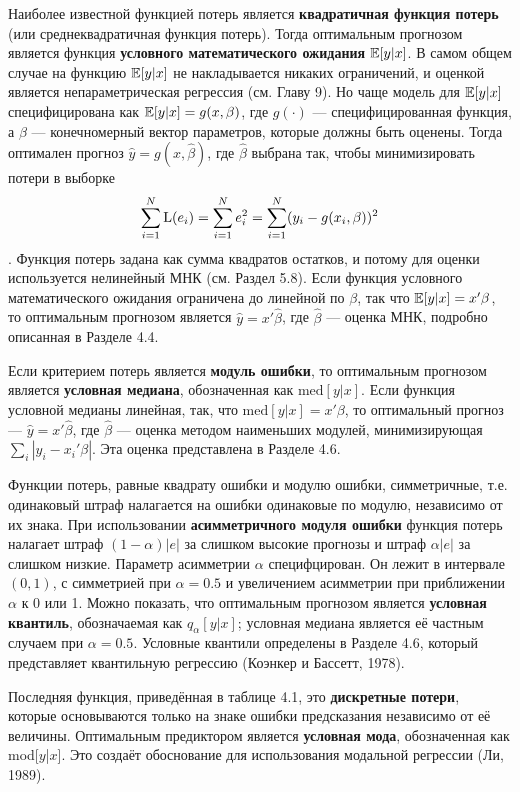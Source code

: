 Наиболее известной функцией потерь является \textbf{квадратичная функция потерь}  (или среднеквадратичная функция потерь). Тогда оптимальным прогнозом является функция \textbf{условного математического ожидания} $\mathbb{E}{[y|x]}$. В самом общем случае на функцию $\mathbb{E}{[y|x]}$ не накладывается никаких ограничений, и оценкой является непараметрическая регрессия (см. Главу 9). Но чаще модель для $\mathbb{E}{[y|x]}$ специфицирована как $\mathbb{E}{[y|x]} = g(x, \beta)$, где $g(\cdot)$ --- специфицированная функция, а $\beta$ --- конечномерный вектор параметров, которые должны быть оценены. Тогда оптимален прогноз $\hat{y} = g(x, \hat{\beta})$, где $\hat{\beta}$ выбрана так, чтобы минимизировать потери в выборке 
\[
\sum_{i=1}^{N}\mathrm{L}(e_i) = \sum_{i=1}^{N}e_i^2 = \sum_{i=1}^{N}(y_i - g(x_i, \beta))^2
\].
Функция потерь задана как сумма квадратов остатков, и потому для оценки используется нелинейный МНК (см. Раздел 5.8). Если функция условного математического ожидания ограничена до линейной по $\beta$, так что $\mathbb{E}{[y|x]} = x' \beta $, то оптимальным прогнозом является $\hat{y}=x'\hat{\beta}$, где $\hat{\beta}$ --- оценка МНК, подробно описанная в Разделе 4.4. 

Если критерием потерь является \textbf{модуль ошибки}, то оптимальным прогнозом является \textbf{условная медиана}, обозначенная как $\mathrm{med}[y|x]$. Если функция условной медианы линейная, так, что $\mathrm{med}[y|x] = x'\beta$, то оптимальный прогноз --- $\hat{y}=x'\hat{\beta}$, где  $\hat{\beta}$ --- оценка методом наименьших модулей, минимизирующая $\sum_i |y_i - x_i ' \beta|$. Эта оценка представлена в Разделе 4.6.

Функции потерь, равные квадрату ошибки и модулю ошибки, симметричные, т.е. одинаковый штраф  налагается на ошибки одинаковые по модулю, независимо от их знака.  При использовании \textbf{асимметричного модуля ошибки}  функция потерь  налагает штраф  $(1-\alpha) |e|$ за слишком высокие прогнозы и штраф $\alpha |e|$ за слишком низкие. Параметр асимметрии $\alpha$ специфцирован. Он лежит в интервале $(0, 1)$, с симметрией при $\alpha = 0.5$ и увеличением асимметрии при приближении $\alpha$ к 0 или 1. Можно показать, что оптимальным прогнозом является \textbf{условная квантиль}, обозначаемая как $q_{\alpha}[y|x]$; условная медиана является её частным случаем при $\alpha = 0.5$. Условные квантили определены в Разделе 4.6, который представляет квантильную регрессию (Коэнкер и Бассетт, 1978).

Последняя функция, приведённая в таблице 4.1, это \textbf{дискретные потери}, которые основываются только на знаке ошибки предсказания независимо от её величины. Оптимальным предиктором является \textbf{условная мода}, обозначенная как mod[$y$|$x$]. Это создаёт обоснование для использования модальной регрессии (Ли, 1989).

